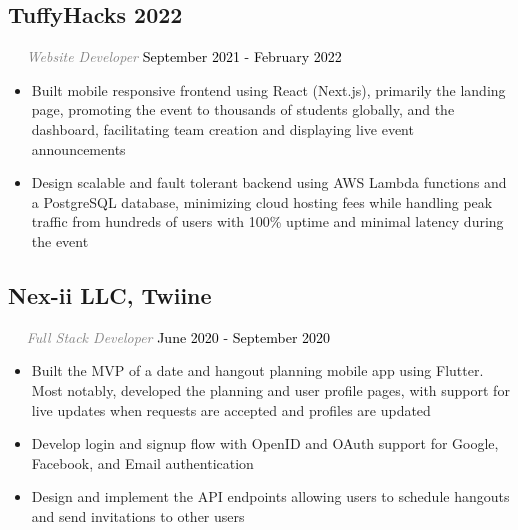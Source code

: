\documentclass{article}
\newcommand{\resumesection}[3]{
    \subsection*{#1}
    \ 
    \ 
    \small
    \textcolor{grey}{\emph{#2}}
    \normalsize
    \hfill
    \textcolor{black}{#3}
    \normalsize
}
\begin{document}
\resumesection{TuffyHacks 2022}{Website Developer}{September 2021 - February 2022}
\begin{itemize}
    \item Built mobile responsive frontend using React (Next.js), primarily the landing page, promoting the event to thousands of students globally, and the dashboard, facilitating team creation and displaying live event announcements
    \item Design scalable and fault tolerant backend using AWS Lambda functions and a PostgreSQL database, minimizing cloud hosting fees while handling peak traffic from hundreds of users with 100\% uptime and minimal latency during the event
\end{itemize}
\resumesection{Nex-ii LLC, Twiine}{Full Stack Developer}{June 2020 - September 2020}
\begin{itemize}
    \item Built the MVP of a date and hangout planning mobile app using Flutter. Most notably, developed the planning and user profile pages, with support for live updates when requests are accepted and profiles are updated
    \item Develop login and signup flow with OpenID and OAuth support for Google, Facebook, and Email authentication
    \item Design and implement the API endpoints allowing users to schedule hangouts and send invitations to other users
\end{itemize}
\end{document}

